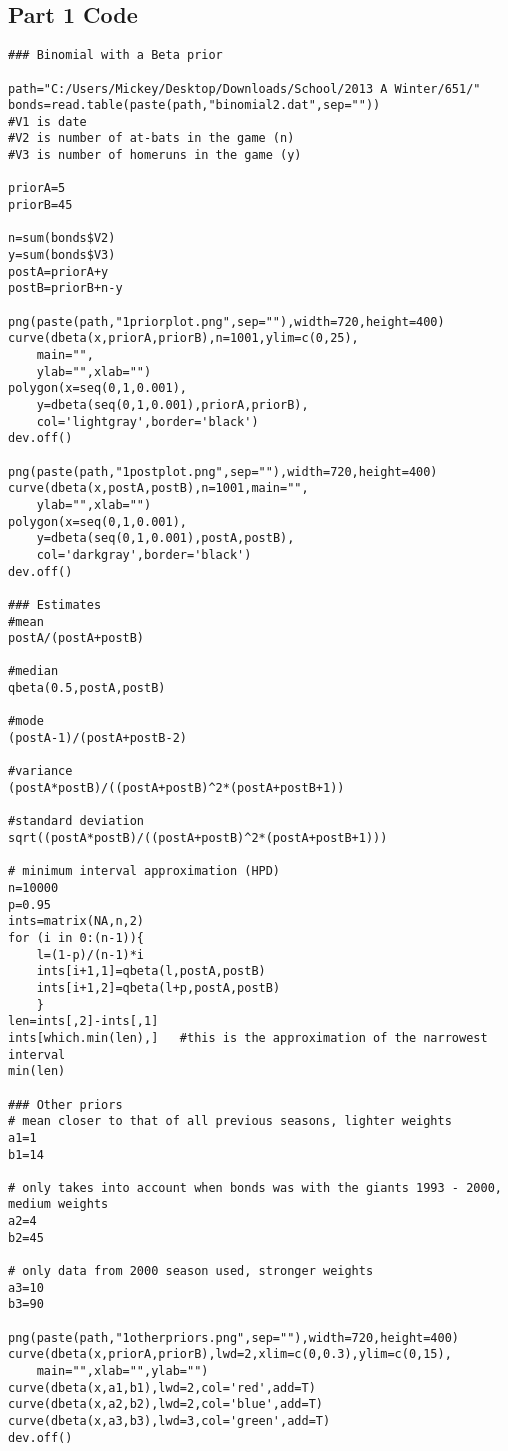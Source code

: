 \documentclass[12pt]{article}
\begin{document}
\subsection*{Part 1 Code}
\begin{scriptsize}
\begin{verbatim}
### Binomial with a Beta prior

path="C:/Users/Mickey/Desktop/Downloads/School/2013 A Winter/651/"
bonds=read.table(paste(path,"binomial2.dat",sep=""))
#V1 is date
#V2 is number of at-bats in the game (n)
#V3 is number of homeruns in the game (y)

priorA=5
priorB=45

n=sum(bonds$V2)
y=sum(bonds$V3)
postA=priorA+y
postB=priorB+n-y

png(paste(path,"1priorplot.png",sep=""),width=720,height=400)
curve(dbeta(x,priorA,priorB),n=1001,ylim=c(0,25),
    main="",
    ylab="",xlab="")
polygon(x=seq(0,1,0.001),
    y=dbeta(seq(0,1,0.001),priorA,priorB),
    col='lightgray',border='black')
dev.off()

png(paste(path,"1postplot.png",sep=""),width=720,height=400)
curve(dbeta(x,postA,postB),n=1001,main="",
    ylab="",xlab="")
polygon(x=seq(0,1,0.001),
    y=dbeta(seq(0,1,0.001),postA,postB),
    col='darkgray',border='black')
dev.off()

### Estimates
#mean
postA/(postA+postB)

#median
qbeta(0.5,postA,postB)

#mode
(postA-1)/(postA+postB-2)

#variance
(postA*postB)/((postA+postB)^2*(postA+postB+1))

#standard deviation
sqrt((postA*postB)/((postA+postB)^2*(postA+postB+1)))

# minimum interval approximation (HPD)
n=10000
p=0.95
ints=matrix(NA,n,2)
for (i in 0:(n-1)){
    l=(1-p)/(n-1)*i
    ints[i+1,1]=qbeta(l,postA,postB)
    ints[i+1,2]=qbeta(l+p,postA,postB)
    }
len=ints[,2]-ints[,1]
ints[which.min(len),]	#this is the approximation of the narrowest interval
min(len)

### Other priors
# mean closer to that of all previous seasons, lighter weights
a1=1
b1=14

# only takes into account when bonds was with the giants 1993 - 2000, medium weights
a2=4
b2=45

# only data from 2000 season used, stronger weights
a3=10
b3=90

png(paste(path,"1otherpriors.png",sep=""),width=720,height=400)
curve(dbeta(x,priorA,priorB),lwd=2,xlim=c(0,0.3),ylim=c(0,15),
    main="",xlab="",ylab="")
curve(dbeta(x,a1,b1),lwd=2,col='red',add=T)
curve(dbeta(x,a2,b2),lwd=2,col='blue',add=T)
curve(dbeta(x,a3,b3),lwd=3,col='green',add=T)
dev.off()
\end{verbatim}
\end{scriptsize}
\end{document}

